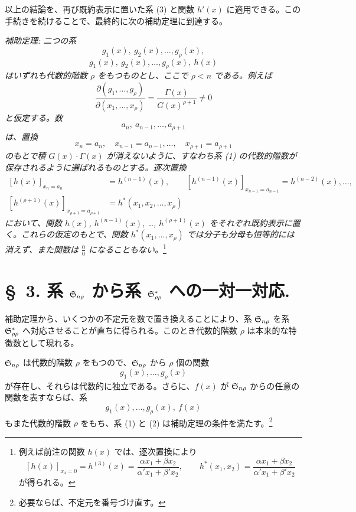 \documentclass[11pt]{jlreq}
\begin{document}
以上の結論を、再び既約表示に置いた系 (3) と関数 $h'(x)$ に適用できる。この手続きを続けることで、最終的に次の補助定理に到達する。

\emph{補助定理: 二つの系}
\[
  g_1(x),\ g_2(x),\ldots,g_\rho(x),
\]
\[
  g_1(x),\ g_2(x),\ldots,g_\rho(x),\ h(x)
\]
\emph{はいずれも代数的階数 $\rho$ をもつものとし、ここで $\rho<n$ である。例えば}
\[
 \frac{\partial(g_1,\ldots,g_\rho)}{\partial(x_1,\ldots,x_\rho)}
 =\frac{\Gamma(x)}{G(x)^{\rho+1}}\ne0
\]
\emph{と仮定する。数}
\[
  a_n,\ a_{n-1},\ldots,a_{\rho+1}
\]
\emph{は、置換}
\[
  x_n=a_n,\quad x_{n-1}=a_{n-1},\ldots,\quad x_{\rho+1}=a_{\rho+1}
\]
\emph{のもとで積 $G(x)\cdot\Gamma(x)$ が消えないように、すなわち系 (1) の代数的階数が保存されるように選ばれるものとする。逐次置換}
\[
\begin{aligned}
 [h(x)]_{x_n=a_n}&=h^{(n-1)}(x),\qquad
 [h^{(n-1)}(x)]_{x_{n-1}=a_{n-1}}=h^{(n-2)}(x),\ldots,\\
 [h^{(\rho+1)}(x)]_{x_{\rho+1}=a_{\rho+1}}&=h^*(x_1,x_2,\ldots,x_\rho)
\end{aligned}
\]
\emph{において、関数 $h(x)$, $h^{(n-1)}(x)$, \ldots, $h^{(\rho+1)}(x)$ をそれぞれ既約表示に置く。これらの仮定のもとで、関数 $h^*(x_1,\ldots,x_\rho)$ では分子も分母も恒等的には消えず、また関数は $\frac{0}{0}$ になることもない。}\footnote{例えば前注の関数 $h(x)$ では、逐次置換により
\[
 [h(x)]_{x_4=0}=h^{(3)}(x)=\frac{\alpha x_1+\beta x_2}{\alpha' x_1+\beta' x_2},\qquad
 h^*(x_1,x_2)=\frac{\alpha x_1+\beta x_2}{\alpha' x_1+\beta' x_2}
\]
が得られる。}

\section*{\S\ 3. 系 $\mathfrak{S}_{n\rho}$ から系 $\mathfrak{S}^*_{\rho\rho}$ への一対一対応.}

補助定理から、いくつかの不定元を数で置き換えることにより、系 $\mathfrak{S}_{n\rho}$ を系 $\mathfrak{S}^*_{\rho\rho}$ へ対応させることが直ちに得られる。このとき代数的階数 $\rho$ は本来的な特徴数として現れる。

$\mathfrak{S}_{n\rho}$ は代数的階数 $\rho$ をもつので、$\mathfrak{S}_{n\rho}$ から $\rho$ 個の関数
\begin{equation}
  g_1(x),\ldots,g_\rho(x)
\tag{1}
\end{equation}
が存在し、それらは代数的に独立である。さらに、$f(x)$ が $\mathfrak{S}_{n\rho}$ からの任意の関数を表すならば、系
\begin{equation}
  g_1(x),\ldots,g_\rho(x),\ f(x)
\tag{2}
\end{equation}
もまた代数的階数 $\rho$ をもち、系 (1) と (2) は補助定理の条件を満たす。\footnote{必要ならば、不定元を番号づけ直す。}
\end{document}
